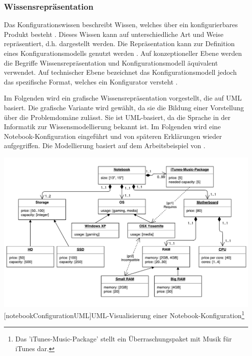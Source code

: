 \documentclass[12pt,a4paper,bibliography=totocnumbered,listof=totoc]{scrartcl}
\begin{document}
\subsubsection{Wissensrepräsentation}
\label{subsubsection:wissenrepraesentation}
Das Konfigurationswissen beschreibt Wissen, welches über ein konfigurierbares Produkt besteht \citep{soininen98}. Dieses Wissen kann auf unterschiedliche Art und Weise repräsentiert, d.h. dargestellt werden. Die Repräsentation kann zur Definition eines Konfigurationsmodells genutzt werden \citep{felferning14}. Auf konzeptioneller Ebene werden die Begriffe Wissensrepräsentation und Konfigurationsmodell äquivalent verwendet. Auf technischer Ebene bezeichnet das Konfigurationsmodell jedoch das spezifische Format, welches ein Konfigurator versteht \citep{soininen98}.

Im Folgenden wird ein grafische Wissensrepräsentation vorgestellt, die auf UML basiert. Die grafische Variante wird gewählt, da sie die Bildung einer Vorstellung über die Problemdomäne zulässt. Sie ist UML-basiert, da die Sprache in der Informatik zur Wissensmodellierung bekannt ist. Im Folgenden wird eine Notebook-Konfiguration eingeführt und von späteren Erklärungen wieder aufgegriffen. Die Modellierung basiert auf dem Arbeitsbeispiel von \citep{felferning14}.

\vspace{1em}
\begin{minipage}{\linewidth}
	\centering
	\includegraphics[width=1\linewidth]{Abbildungen/notebookConfigurationUML.pdf}
	[notebookConfigurationUML]{UML-Visualisierung einer Notebook-Konfiguration\footnote{Das 'iTunes-Music-Package' stellt ein Überraschungspaket mit Musik für iTunes dar.}}
	\label{fig:notebookConfigurationUML}
\end{minipage}
\vspace{1em}
\end{document}
